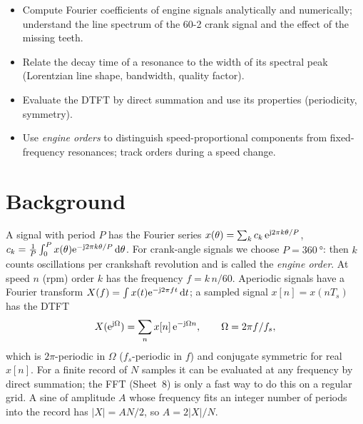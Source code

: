 
\begin{goals}
\begin{itemize}
  \item Compute Fourier coefficients of engine signals analytically and
    numerically; understand the line spectrum of the 60-2 crank signal and
    the effect of the missing teeth.
  \item Relate the decay time of a resonance to the width of its spectral
    peak (Lorentzian line shape, bandwidth, quality factor).
  \item Evaluate the DTFT by direct summation and use its properties
    (periodicity, symmetry).
  \item Use \emph{engine orders} to distinguish speed-proportional
    components from fixed-frequency resonances; track orders during a
    speed change.
\end{itemize}
\end{goals}

\section*{Background}

A signal with period $P$ has the Fourier series
$x(\theta)=\sum_k c_k\,\mathrm{e}^{\mathrm{j}2\pi k\theta/P}$,
$c_k=\frac1P\int_0^P x(\theta)\mathrm{e}^{-\mathrm{j}2\pi k\theta/P}\,\mathrm{d}\theta$. For crank-angle
signals we choose $P=\SI{360}{\degree}$: then $k$ counts oscillations per
crankshaft revolution and is called the \emph{engine order}. At speed $n$
(rpm) order $k$ has the frequency $f=k\,n/60$. Aperiodic signals have a
Fourier transform $X(f)=\int x(t)\mathrm{e}^{-\mathrm{j}2\pi ft}\,\mathrm{d} t$; a sampled signal
$x[n]=x(nT_s)$ has the DTFT
\[
X(\mathrm{e}^{\mathrm{j}\Omega})=\sum_n x[n]\,\mathrm{e}^{-\mathrm{j}\Omega n},\qquad \Omega=2\pi f/f_s ,
\]
which is $2\pi$-periodic in $\Omega$ ($f_s$-periodic in $f$) and conjugate
symmetric for real $x[n]$. For a finite record of $N$ samples it can be
evaluated at any frequency by direct summation; the FFT (Sheet~8) is only a
fast way to do this on a regular grid. A sine of amplitude $A$ whose frequency
fits an integer number of periods into the record has $|X|=AN/2$, so
$A=2|X|/N$.

